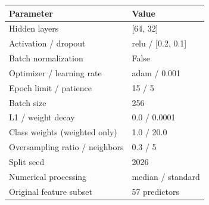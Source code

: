 \begin{tabular}{ll}
\toprule Parameter & Value \\
\midrule
Hidden layers & [64, 32] \\
Activation / dropout & relu / [0.2, 0.1] \\
Batch normalization & False \\
Optimizer / learning rate & adam / 0.001 \\
Epoch limit / patience & 15 / 5 \\
Batch size & 256 \\
L1 / weight decay & 0.0 / 0.0001 \\
Class weights (weighted only) & 1.0 / 20.0 \\
Oversampling ratio / neighbors & 0.3 / 5 \\
Split seed & 2026 \\
Numerical processing & median / standard \\
Original feature subset & 57 predictors \\
\bottomrule
\end{tabular}